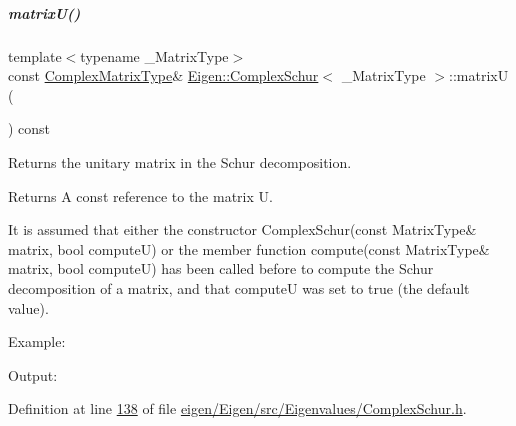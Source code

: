 \mbox{\label{group___eigenvalues___module_afed8177cf9836f032d42bdb6c6bc6e01}} 
\subparagraph{\texorpdfstring{matrix\+U()}{matrixU()}\hspace{0.1cm}{\footnotesize\ttfamily [1/2]}}
{\footnotesize\ttfamily template$<$typename \+\_\+\+Matrix\+Type$>$ \\
const \hyperlink{group___eigenvalues___module_af61fe57877d51cfb50178f78534042f0}{Complex\+Matrix\+Type}\& \hyperlink{group___eigenvalues___module_class_eigen_1_1_complex_schur}{Eigen\+::\+Complex\+Schur}$<$ \+\_\+\+Matrix\+Type $>$\+::matrixU (\begin{DoxyParamCaption}{ }\end{DoxyParamCaption}) const\hspace{0.3cm}{\ttfamily [inline]}}



Returns the unitary matrix in the Schur decomposition. 

\begin{DoxyReturn}{Returns}
A const reference to the matrix U.
\end{DoxyReturn}
It is assumed that either the constructor Complex\+Schur(const Matrix\+Type\& matrix, bool compute\+U) or the member function compute(const Matrix\+Type\& matrix, bool compute\+U) has been called before to compute the Schur decomposition of a matrix, and that {\ttfamily computeU} was set to true (the default value).

Example\+: 
\begin{DoxyCodeInclude}
\end{DoxyCodeInclude}
 Output\+: 
\begin{DoxyVerbInclude}
\end{DoxyVerbInclude}
 

Definition at line \hyperlink{eigen_2_eigen_2src_2_eigenvalues_2_complex_schur_8h_source_l00138}{138} of file \hyperlink{eigen_2_eigen_2src_2_eigenvalues_2_complex_schur_8h_source}{eigen/\+Eigen/src/\+Eigenvalues/\+Complex\+Schur.\+h}.


